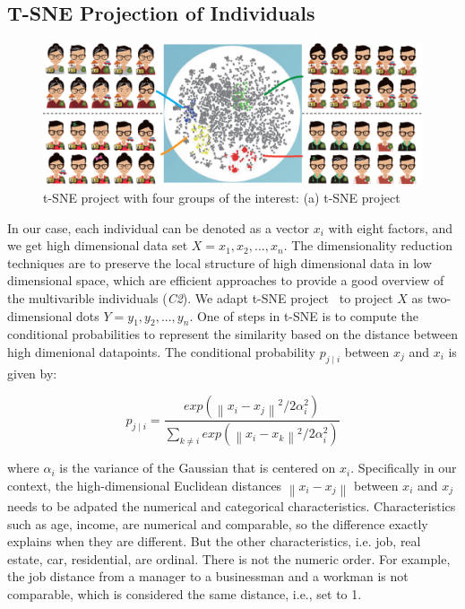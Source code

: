 \subsection{T-SNE Projection of Individuals}

\begin{figure}[htb!]
 \centering %
 \includegraphics[width=\columnwidth]{pictures/tsne}
 \caption{t-SNE project with four groups of the interest: (a) t-SNE project }
 \label{fig:tsne}
\end{figure}

In our case, each individual can be denoted as a vector $x_i$ with eight factors, and we get high dimensional data set $X={x_1, x_2, ..., x_n}$. The dimensionality reduction techniques are to preserve the local structure of high dimensional data in low dimensional space, which are efficient approaches to provide a good overview of the multivarible individuals (\textit{C2}). We adapt t-SNE project~\citep{maaten2008visualizing} to project $X$ as two-dimensional dots $Y={y_1, y_2, ..., y_n}$. One of steps in t-SNE is to compute the conditional probabilities to represent the similarity based on the distance between high dimenional datapoints. The conditional probability $p_{j\mid i}$ between $x_j$ and $x_i$ is given by:

\begin{equation}
p_{j\mid i} = \frac{exp({\left \| x_i - x_j \right \|}^2/2\alpha_i ^{2})}{\sum _{k\neq i}exp({\left \| x_i - x_k \right \|}^2/2\alpha_i ^{2})}
\end{equation}

where $\alpha_i$ is the variance of the Gaussian that is centered on $x_i$. Specifically in our context, the high-dimensional Euclidean distances $\left \| x_i - x_j \right \|$ between $x_i$ and $x_j$ needs to be adpated the numerical and categorical characteristics. Characteristics such as age, income, are numerical and comparable, so the difference exactly explains when they are different. But the other characteristics, i.e. job, real estate, car, residential, are ordinal. There is not the numeric order. For example, the job distance from a manager to a businessman and a workman is not comparable, which is considered the same distance, i.e., set to 1.



